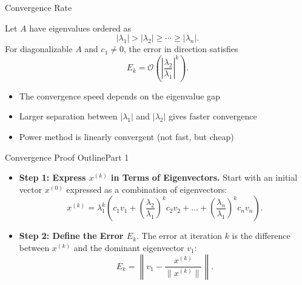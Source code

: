 \documentclass[10pt]{beamer}
\begin{document}
\begin{frame}{Convergence Rate}

\begin{theorem}
Let \( A \) have eigenvalues ordered as
\[
|\lambda_1| > |\lambda_2| \ge \cdots \ge |\lambda_n|.
\]
For diagonalizable $A$ and $c_1\ne0$, the error in direction satisfies
\[
E_k = \mathcal{O}\!\left(\left|\frac{\lambda_2}{\lambda_1}\right|^k\right).
\]
\end{theorem}


\vspace{5mm}
\begin{itemize}
    \item The convergence speed depends on the eigenvalue gap
    \item Larger separation between \( |\lambda_1| \) and \( |\lambda_2| \) gives faster convergence
    \item Power method is linearly convergent (not fast, but cheap)
\end{itemize}
\end{frame}
\begin{frame}{Convergence Proof Outline}{Part 1}

\begin{itemize}
    \item \textbf{Step 1: Express \( x^{(k)} \) in Terms of Eigenvectors.}  
    Start with an initial vector \( x^{(0)} \) expressed as a combination of eigenvectors:
    \[
    x^{(k)} = \lambda_1^k\left( c_1 v_1 + \left(\frac{\lambda_2}{\lambda_1}\right)^k c_2 v_2 + \dots + \left(\frac{\lambda_n}{\lambda_1}\right)^k c_n v_n \right).
    \]
    
    \vspace{4mm}
    
    \item \textbf{Step 2: Define the Error \( E_k \)}.  
    The error at iteration \( k \) is the difference between \( x^{(k)} \) and the dominant eigenvector \( v_1 \):
    \[
    E_k = \left\| v_1 - \frac{x^{(k)}}{\|x^{(k)}\|} \right\|.
    \]

    \vspace{4mm}

\end{itemize}
\end{frame}
\end{document}
